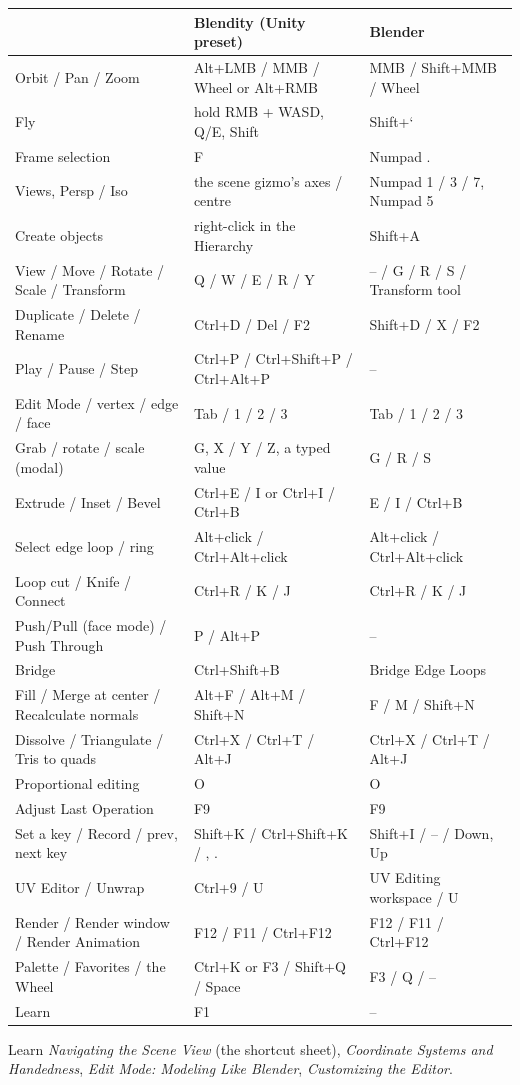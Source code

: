 \begin{center}
\small
\begin{tabularx}{\textwidth}{Xll}
\toprule
 & Blendity (Unity preset) & Blender \\
\midrule
Orbit / Pan / Zoom & Alt+LMB / MMB / Wheel or Alt+RMB & MMB / Shift+MMB / Wheel \\
Fly & hold RMB + WASD, Q/E, Shift & Shift+` \\
Frame selection & F & Numpad . \\
Views, Persp / Iso & the scene gizmo's axes / centre & Numpad 1 / 3 / 7, Numpad 5 \\
Create objects & right-click in the Hierarchy & Shift+A \\
View / Move / Rotate / Scale / Transform & Q / W / E / R / Y & -- / G / R / S / Transform tool \\
Duplicate / Delete / Rename & Ctrl+D / Del / F2 & Shift+D / X / F2 \\
Play / Pause / Step & Ctrl+P / Ctrl+Shift+P / Ctrl+Alt+P & -- \\
Edit Mode / vertex / edge / face & Tab / 1 / 2 / 3 & Tab / 1 / 2 / 3 \\
Grab / rotate / scale (modal) & G, X / Y / Z, a typed value & G / R / S \\
Extrude / Inset / Bevel & Ctrl+E / I or Ctrl+I / Ctrl+B & E / I / Ctrl+B \\
Select edge loop / ring & Alt+click / Ctrl+Alt+click & Alt+click / Ctrl+Alt+click \\
Loop cut / Knife / Connect & Ctrl+R / K / J & Ctrl+R / K / J \\
Push/Pull (face mode) / Push Through & P / Alt+P & -- \\
Bridge & Ctrl+Shift+B & Bridge Edge Loops \\
Fill / Merge at center / Recalculate normals & Alt+F / Alt+M / Shift+N & F / M / Shift+N \\
Dissolve / Triangulate / Tris to quads & Ctrl+X / Ctrl+T / Alt+J & Ctrl+X / Ctrl+T / Alt+J \\
Proportional editing & O & O \\
Adjust Last Operation & F9 & F9 \\
Set a key / Record / prev, next key & Shift+K / Ctrl+Shift+K / , . & Shift+I / -- / Down, Up \\
UV Editor / Unwrap & Ctrl+9 / U & UV Editing workspace / U \\
Render / Render window / Render Animation & F12 / F11 / Ctrl+F12 & F12 / F11 / Ctrl+F12 \\
Palette / Favorites / the Wheel & Ctrl+K or F3 / Shift+Q / Space & F3 / Q / -- \\
Learn & F1 & -- \\
\bottomrule
\end{tabularx}
\end{center}

\begin{fromnote}{Learn}
\emph{Navigating the Scene View} (the shortcut sheet), \emph{Coordinate Systems and Handedness}, \emph{Edit Mode:
Modeling Like Blender}, \emph{Customizing the Editor}.
\end{fromnote}
